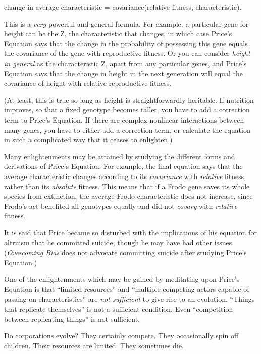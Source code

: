 {\centering
 change in average characteristic = covariance(relative fitness,
characteristic).
\par}


\bigskip

{
 This is a \textit{very} powerful and general formula. For example,
a particular gene for height can be the Z, the characteristic that
changes, in which case Price's Equation says that the
change in the probability of possessing this gene equals the covariance
of the gene with reproductive fitness. Or you can consider
\textit{height in general} as the characteristic Z, apart from any
particular genes, and Price's Equation says that the
change in height in the next generation will equal the covariance of
height with relative reproductive fitness. }

{
 (At least, this is true so long as height is straightforwardly
heritable. If nutrition improves, so that a fixed genotype becomes
taller, you have to add a correction term to Price's
Equation. If there are complex nonlinear interactions between many
genes, you have to either add a correction term, or calculate the
equation in such a complicated way that it ceases to enlighten.)}

{
 Many enlightenments may be attained by studying the different
forms and derivations of Price's Equation. For example,
the final equation says that the average characteristic changes
according to its \textit{covariance} with \textit{relative} fitness,
rather than its \textit{absolute} fitness. This means that if a Frodo
gene saves its whole species from extinction, the average Frodo
characteristic does not increase, since Frodo's act
benefited all genotypes equally and did not \textit{covary} with
\textit{relative} fitness.}

{
 It is said that Price became so disturbed with the implications of
his equation for altruism that he committed suicide, though he may have
had other issues. (\textit{Overcoming Bias} does not advocate
committing suicide after studying Price's Equation.)}

{
 One of the enlightenments which may be gained by meditating upon
Price's Equation is that ``limited
resources'' and ``multiple competing
actors capable of passing on characteristics'' are
\textit{not sufficient} to give rise to an evolution.
``Things that replicate themselves''
is not a sufficient condition. Even ``competition
between replicating things'' is not sufficient.}

{
 Do corporations evolve? They certainly compete. They occasionally
spin off children. Their resources are limited. They sometimes die.}

